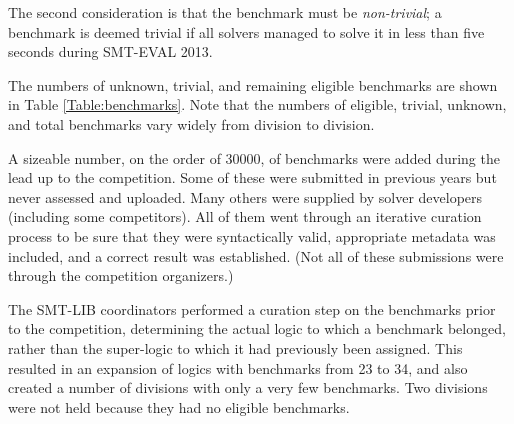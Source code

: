 \documentclass[twoside,11pt]{article}
\begin{document}
The second consideration is that the benchmark must be \textit{non-trivial}; a benchmark is deemed trivial if all solvers managed to solve it in less than five seconds during SMT-EVAL 2013.

The numbers of unknown, trivial, and remaining eligible benchmarks are shown in Table \ref{Table:benchmarks}. Note that the numbers of eligible, trivial, unknown, and total benchmarks vary widely from division to division.

A sizeable number, on the order of 30000, of benchmarks were added during the lead up to the competition. Some of these were submitted in previous years but never assessed and uploaded. Many others were supplied by solver developers (including some competitors). All of them went through an iterative curation process to be sure that they were syntactically valid, appropriate metadata was included, and a correct result was established. (Not all of these submissions were through the competition organizers.)

The SMT-LIB coordinators performed a curation step on the benchmarks prior to the competition, determining the actual logic to which a benchmark belonged, rather than the super-logic to which it had previously been assigned. This resulted in an expansion of logics with benchmarks from 23 to 34, and also created a number of divisions with only a very few benchmarks. Two divisions were not held because they had no eligible benchmarks.
\end{document}
